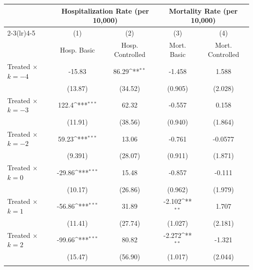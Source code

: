 {
\def\sym#1{\ifmmode^{#1}\else\(^{#1}\)\fi}
\begin{tabular}{l*{4}{c}}
\toprule
                    &\multicolumn{2}{c}{Hospitalization Rate (per 10,000)}&\multicolumn{2}{c}{Mortality Rate (per 10,000)}\\\cmidrule(lr){2-3}\cmidrule(lr){4-5}
                    &\multicolumn{1}{c}{(1)}&\multicolumn{1}{c}{(2)}&\multicolumn{1}{c}{(3)}&\multicolumn{1}{c}{(4)}\\
                    &\multicolumn{1}{c}{Hosp. Basic}&\multicolumn{1}{c}{Hosp. Controlled}&\multicolumn{1}{c}{Mort. Basic}&\multicolumn{1}{c}{Mort. Controlled}\\
\midrule
Treated $\times$ $k = -4$&      -15.83         &       86.29\sym{**} &      -1.458         &       1.588         \\
                    &     (13.87)         &     (34.52)         &     (0.905)         &     (2.028)         \\
\addlinespace
Treated $\times$ $k = -3$&       122.4\sym{***}&       62.32         &      -0.557         &       0.158         \\
                    &     (11.91)         &     (38.56)         &     (0.940)         &     (1.864)         \\
\addlinespace
Treated $\times$ $k = -2$&       59.23\sym{***}&       13.06         &      -0.761         &     -0.0577         \\
                    &     (9.391)         &     (28.07)         &     (0.911)         &     (1.871)         \\
\addlinespace
Treated $\times$ $k = 0$&      -29.86\sym{***}&       15.48         &      -0.857         &      -0.111         \\
                    &     (10.17)         &     (26.86)         &     (0.962)         &     (1.979)         \\
\addlinespace
Treated $\times$ $k = 1$&      -56.86\sym{***}&       31.89         &      -2.102\sym{**} &       1.707         \\
                    &     (11.41)         &     (27.74)         &     (1.027)         &     (2.181)         \\
\addlinespace
Treated $\times$ $k = 2$&      -99.66\sym{***}&       80.82         &      -2.272\sym{**} &      -1.321         \\
                    &     (15.47)         &     (56.90)         &     (1.017)         &     (2.044)         \\
\addlinespace

\end{tabular}}
